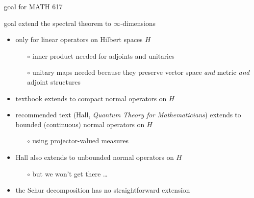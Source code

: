 \documentclass[10pt,hyperref]{beamer}
\begin{document}
\begin{frame}{goal for MATH 617}

\begin{block}{goal}
extend the spectral theorem to $\infty$-dimensions
\end{block}

\begin{itemize}
\item only for linear operators on Hilbert spaces $H$
    \begin{itemize}
    \item[$\circ$] inner product needed for adjoints and unitaries
    \item[$\circ$] unitary maps needed because they preserve vector space \emph{and} metric \emph{and} adjoint structures
    \end{itemize}
\item textbook extends to \alert{compact normal operators} on $H$
\item recommended text (Hall, \emph{Quantum Theory for Mathematicians}) extends to \alert{bounded (continuous) normal operators} on $H$
    \begin{itemize}
    \item[$\circ$] using projector-valued measures
    \end{itemize}
\item Hall also extends to unbounded normal operators on $H$
    \begin{itemize}
    \item[$\circ$] but we won't get there \dots
    \end{itemize}
\item the Schur decomposition has no straightforward extension
\end{itemize}
\end{frame}


\end{document}
